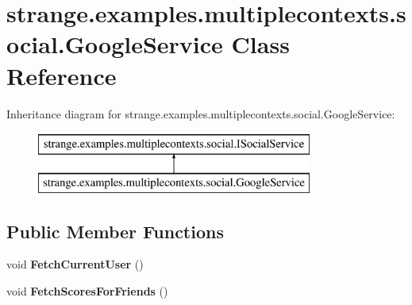 \hypertarget{classstrange_1_1examples_1_1multiplecontexts_1_1social_1_1_google_service}{\section{strange.\-examples.\-multiplecontexts.\-social.\-Google\-Service Class Reference}
\label{classstrange_1_1examples_1_1multiplecontexts_1_1social_1_1_google_service}
}
Inheritance diagram for strange.\-examples.\-multiplecontexts.\-social.\-Google\-Service\-:\begin{figure}[H]
\begin{center}
\leavevmode
\includegraphics[height=2.000000cm]{classstrange_1_1examples_1_1multiplecontexts_1_1social_1_1_google_service}
\end{center}
\end{figure}
\subsection*{Public Member Functions}
\begin{DoxyCompactItemize}
\item 
\hypertarget{classstrange_1_1examples_1_1multiplecontexts_1_1social_1_1_google_service_a3e5ffb505883ddf7eb3394c662816d96}{void {\bfseries Fetch\-Current\-User} ()}\label{classstrange_1_1examples_1_1multiplecontexts_1_1social_1_1_google_service_a3e5ffb505883ddf7eb3394c662816d96}

\item 
\hypertarget{classstrange_1_1examples_1_1multiplecontexts_1_1social_1_1_google_service_a79d5aadc62db74c42c64b3eb9de83241}{void {\bfseries Fetch\-Scores\-For\-Friends} ()}\label{classstrange_1_1examples_1_1multiplecontexts_1_1social_1_1_google_service_a79d5aadc62db74c42c64b3eb9de83241}

\end{DoxyCompactItemize}
